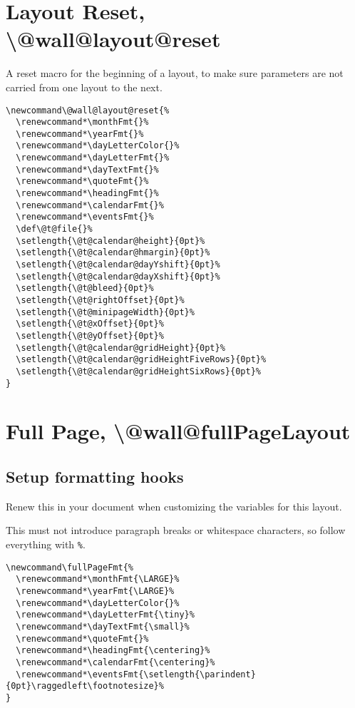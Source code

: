 \documentclass[11pt,oneside]{memoir-article}
\begin{document}
\section{Layout Reset, \textbackslash @wall@layout@reset}
\label{sec:org7522fd9}

A reset macro for the beginning of a layout, to make sure parameters are not
carried from one layout to the next.

\begin{verbatim}
\newcommand\@wall@layout@reset{%
  \renewcommand*\monthFmt{}%
  \renewcommand*\yearFmt{}%
  \renewcommand*\dayLetterColor{}%
  \renewcommand*\dayLetterFmt{}%
  \renewcommand*\dayTextFmt{}%
  \renewcommand*\quoteFmt{}%
  \renewcommand*\headingFmt{}%
  \renewcommand*\calendarFmt{}%
  \renewcommand*\eventsFmt{}%
  \def\@t@file{}%
  \setlength{\@t@calendar@height}{0pt}%
  \setlength{\@t@calendar@hmargin}{0pt}%
  \setlength{\@t@calendar@dayYshift}{0pt}%
  \setlength{\@t@calendar@dayXshift}{0pt}%
  \setlength{\@t@bleed}{0pt}%
  \setlength{\@t@rightOffset}{0pt}%
  \setlength{\@t@minipageWidth}{0pt}%
  \setlength{\@t@xOffset}{0pt}%
  \setlength{\@t@yOffset}{0pt}%
  \setlength{\@t@calendar@gridHeight}{0pt}%
  \setlength{\@t@calendar@gridHeightFiveRows}{0pt}%
  \setlength{\@t@calendar@gridHeightSixRows}{0pt}%
}
\end{verbatim}

\section{Full Page, \textbackslash @wall@fullPageLayout}
\label{sec:orge4db85d}
\subsection{Setup formatting hooks}
\label{sec:orge713968}

Renew this in your document when customizing the variables for this layout.

This must not introduce paragraph breaks or whitespace characters, so follow
everything with \texttt{\%}.

\begin{verbatim}
\newcommand\fullPageFmt{%
  \renewcommand*\monthFmt{\LARGE}%
  \renewcommand*\yearFmt{\LARGE}%
  \renewcommand*\dayLetterColor{}%
  \renewcommand*\dayLetterFmt{\tiny}%
  \renewcommand*\dayTextFmt{\small}%
  \renewcommand*\quoteFmt{}%
  \renewcommand*\headingFmt{\centering}%
  \renewcommand*\calendarFmt{\centering}%
  \renewcommand*\eventsFmt{\setlength{\parindent}{0pt}\raggedleft\footnotesize}%
}
\end{verbatim}
\end{document}
